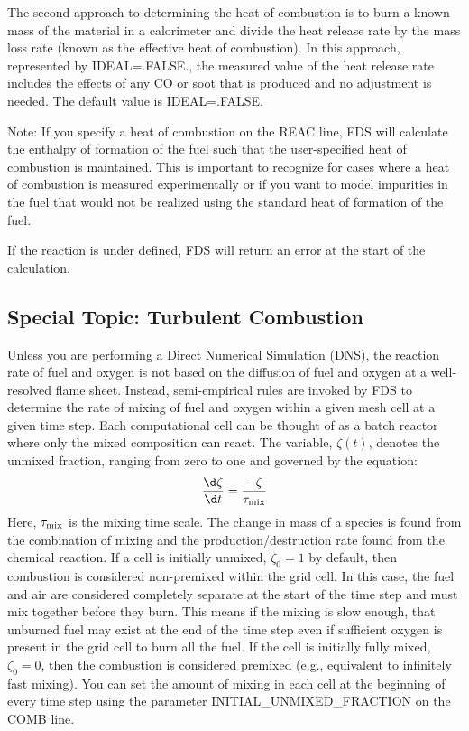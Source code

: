 \documentclass[11pt]{book}
\begin{document}
The second approach to determining the heat of combustion is to burn a known mass of the material in a calorimeter and divide the heat release
rate by the mass loss rate (known as the effective heat of combustion).  In this approach, represented by {\ct IDEAL=.FALSE.},
the measured value of the heat release rate includes the effects of any CO or soot that is produced and no adjustment is needed.  The default value is {\ct IDEAL=.FALSE.}

Note: If you specify a heat of combustion on the {\ct REAC} line, FDS will calculate the enthalpy of formation of the fuel such that the user-specified heat of combustion is maintained. This is important to recognize for cases where a heat of combustion is measured experimentally or if you want to model impurities in the fuel that would not be realized using the standard heat of formation of the fuel.

If the reaction is under defined, FDS will return an error at the start of the calculation.


\subsection{Special Topic: Turbulent Combustion}

\label{info:turbulent_combustion}

Unless you are performing a Direct Numerical Simulation (DNS), the reaction rate of fuel and oxygen is not based on the diffusion of fuel and oxygen at a well-resolved flame sheet. Instead, semi-empirical rules are invoked by FDS to determine the rate of mixing of fuel and oxygen within a given mesh cell at a given time step. Each computational cell can be thought of as a batch reactor where only the mixed composition can react. The variable, $\zeta(t)$, denotes the unmixed fraction, ranging from zero to one and governed by the equation:
\begin{equation}
\frac{\d \zeta}{\d t}=\frac{-\zeta}{\tau_{\rm mix}}
\label{eq:edc_mix}
\end{equation}
Here, $\tau_{\rm mix}$ is the mixing time scale. The change in mass of a species is found from the combination of mixing and the production/destruction rate found from the chemical reaction. If a cell is initially unmixed, $\zeta_0=1$ by default, then combustion is considered non-premixed within the grid cell.  In this case, the fuel and air are considered completely separate at the start of the time step and must mix together before they burn.  This means if the mixing is slow enough, that unburned fuel may exist at the end of the time step even if sufficient oxygen is present in the grid cell to burn all the fuel. If the cell is initially fully mixed, $\zeta_0=0$, then the combustion is considered premixed (e.g., equivalent to infinitely fast mixing). You can set the amount of mixing in each cell at the beginning of every time step using the parameter {\ct INITIAL\_UNMIXED\_FRACTION} on the {\ct COMB} line.
\end{document}
